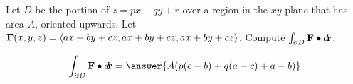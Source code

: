 \documentclass{ximera}
\author{David Guichard \and Neal Koblitz \and H. Jerome Keisler \and Albert Scheller \and Barry Balof \and Mike Wills \and Matthew Carr}
\begin{document}
\begin{exercise}




Let $D$ be the portion of $z=px+qy+r$ over a region in the $xy$-plane that has area $A$, oriented upwards. Let $\mathbf{F}(x,y,z)=\left\langle ax+by+cz,ax+by+cz,ax+by+cz\right\rangle$. Compute $\int_{\partial D}\mathbf{F}\bullet\mathop{}\!d\!\mathbf{r}$.

\begin{prompt}
\[
\int_{\partial D}\vec{F}\dotp\d\vec{r}=\answer{A(p(c-b)+q(a-c)+a-b)}
\]
\end{prompt}


\end{exercise}
\end{document}
